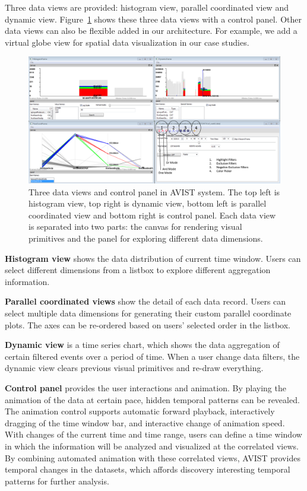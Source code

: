 \documentclass[journal]{vgtc}                %
\begin{document}
{%

Three data views are provided: histogram view, parallel coordinated view and dynamic view. Figure~\ref{fig:views} shows these three data views with a control panel. Other data views can also be flexible added in our architecture. For example, we add a virtual globe view for spatial data visualization in our case studies. 

\begin{figure}[htb]
	\centering
	\includegraphics[width=1.0\linewidth]{pic/DataView.png}
	\parbox[t]{1.0\columnwidth}{\relax
	}
	\caption{\label{fig:views}
		Three data views and control panel in AVIST system. The top left is histogram view, top right is dynamic view, bottom left is parallel coordinated view and bottom right is control panel. Each data view is separated into two parts: the canvas for rendering visual primitives and the panel for exploring different data dimensions.}
\end{figure}  

\textbf{Histogram view} shows the data distribution of  current time window. Users can select different dimensions  from a listbox to explore different aggregation information.

\textbf{Parallel coordinated views} show the detail of each data record. Users can select multiple data dimensions for generating their custom parallel coordinate plots. The axes can be re-ordered based on users' selected order in the listbox.

\textbf{Dynamic view} is a time series  chart, which shows the data aggregation of certain filtered events over a period of time. When a user change data filters, the dynamic view clears previous visual primitives and re-draw everything. 

\textbf{Control panel} provides the user interactions and animation. By playing the animation of the data at certain pace,  hidden temporal patterns can be revealed. The animation control supports automatic forward playback, interactively dragging of the time window bar, and interactive change of animation speed. With changes of the current time and time range, users can define a time window in which the information will be analyzed and visualized at the correlated views. By combining automated animation with these correlated views, AVIST provides  temporal changes in the datasets, which affords  discovery interesting temporal patterns for further analysis.

}
\end{document}
